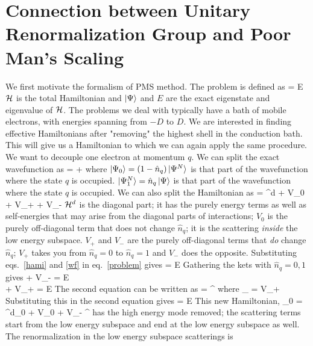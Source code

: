 \documentclass[14pt]{extarticle}
\numberwithin{equation}{section}
\begin{document}
\section{Connection between Unitary Renormalization Group and Poor Man's Scaling}
We first motivate the formalism of PMS method. The problem is defined as
\beq[problem]
\ham\ket{\Psi} = E\ket{\Psi}
\eeq
\(\mathcal{H}\) is the total Hamiltonian and \(\ket{\Psi}\) and \(E\) are the exact eigenstate and eigenvalue of \(\mathcal{H}\). The problems we deal with typically have a bath of mobile electrons, with energies spanning from \(-D\) to \(D\). We are interested in finding effective Hamiltonians after "removing" the highest shell in the conduction bath. This will give us a Hamiltonian to which we can again apply the same procedure.
\pb We want to decouple one electron at momentum \(q\). We can split the exact wavefunction as
\beq[wf]
\ket{\Psi} =  + 
\eeq
where \(\ket{\Psi_0} = \left({1 - \hat n_{q}}\right)\ket{\Psi^N}\) is that part of the wavefunction where the state \(q\) is occupied. \(\ket{\Psi^N_1} = \hat n_q \ket{\Psi}\) is that part of the wavefunction where the state \(q\) is occupied. We can also split the Hamiltonian as
\beq[hami]
\ham = \ham^d + V_0 + V_+ + V_-
\eeq
\(\mathcal{H}^d\) is the diagonal part; it has the purely energy terms as well as self-energies that may arise from the diagonal parts of interactions; \(V_0\) is the purely off-diagonal term that does not change \(\hat n_q\); it is the scattering \textit{inside} the low energy subspace. \(V_+\) and \(V_-\) are the purely off-diagonal terms that \textit{do} change \(\hat n_q\); \(V_+\) takes you from \(\hat n_q = 0\) to \(\hat n_q = 1\) and \(V_-\) does the opposite.
\pb Substituting eqs.~\ref{hami} and \ref{wf} in eq.~\ref{problem} gives
\beq
{} = E
\eeq
Gathering the kets with \(\hat n_q = 0,1\) gives
\beq
{} + V_-  = E\\
 + V_+ = E
\eeq
The second equation can be written as
\beq
{} = \eta^\dagger {}
\eeq
where
\beq
\rr{\eta^\dagger}_ = V_+
\eeq
Substituting this in the second equation gives
\beq[reneq]
 = E
\eeq
This new Hamiltonian,
\beq
\tilde \ham_0 = \ham^d_0 + V_0 + V_- \eta^\dagger
\eeq
has the high energy mode removed; the scattering terms start from the low energy subspace and end at the low energy subspace as well. The renormalization in the low energy subspace scatterings  is
\end{document}
